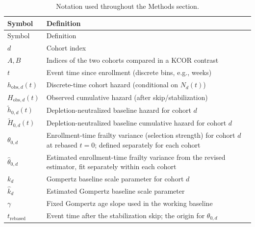 \documentclass[
]{article}
\begin{document}
\begin{longtable}[]{@{}
  >{\raggedright\arraybackslash}p{}
  >{\raggedright\arraybackslash}p{}@{}}
\caption{Notation used throughout the Methods section.}\label{tbl:notation}\tabularnewline
\toprule\noalign{}
\begin{minipage}[b]{\linewidth}\raggedright
Symbol
\end{minipage} & \begin{minipage}[b]{\linewidth}\raggedright
Definition
\end{minipage} \\
\midrule\noalign{}
\endfirsthead
\toprule\noalign{}
\begin{minipage}[b]{\linewidth}\raggedright
Symbol
\end{minipage} & \begin{minipage}[b]{\linewidth}\raggedright
Definition
\end{minipage} \\
\midrule\noalign{}
\endhead
\bottomrule\noalign{}
\endlastfoot
\(d\) & Cohort index \\
\(A,B\) & Indices of the two cohorts compared in a KCOR contrast \\
\(t\) & Event time since enrollment (discrete bins, e.g., weeks) \\
\(h_{\mathrm{obs},d}(t)\) & Discrete-time cohort hazard (conditional on \(N_d(t)\)) \\
\(H_{\mathrm{obs},d}(t)\) & Observed cumulative hazard (after skip/stabilization) \\
\(\tilde h_{0,d}(t)\) & Depletion-neutralized baseline hazard for cohort \(d\) \\
\(\tilde H_{0,d}(t)\) & Depletion-neutralized baseline cumulative hazard for cohort \(d\) \\
\(\theta_{0,d}\) & Enrollment-time frailty variance (selection strength) for cohort \(d\) at rebased \(t=0\); defined separately for each cohort \\
\(\hat{\theta}_{0,d}\) & Estimated enrollment-time frailty variance from the revised estimator, fit separately within each cohort \\
\(k_d\) & Gompertz baseline scale parameter for cohort \(d\) \\
\(\hat{k}_d\) & Estimated Gompertz baseline scale parameter \\
\(\gamma\) & Fixed Gompertz age slope used in the working baseline \\
\(t_{\mathrm{rebased}}\) & Event time after the stabilization skip; the origin for \(\theta_{0,d}\) \\

\end{longtable}
\end{document}
